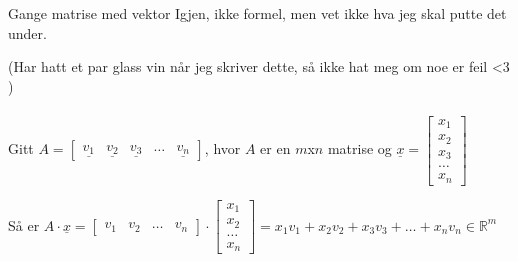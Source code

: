 \documentclass[11pt, a4paper, norsk]{article}
\begin{document}
        \begin{Formel}{Gange matrise med vektor}{}
            Igjen, ikke formel, men vet ikke hva jeg skal putte det under. 

            (Har hatt et par glass vin når jeg skriver dette, så ikke hat meg om noe er feil <3 )
            \\
            \\
            Gitt $A=\begin{bmatrix}
                \underline{v_1} & \underline{v_2} & \underline{v_3} & \dots & \underline{v_{n}}
            \end{bmatrix}$, hvor $A$ er en $m$x$n$ matrise og $\underline{x} = \begin{bmatrix}
                x_1 \\
                x_2 \\
                x_3 \\
                \dots \\
                x_{n}
            \end{bmatrix}$

            Så er $A \cdot \underline{x} = \begin{bmatrix}
                v_1 & v_2 & \dots & v_{n}
            \end{bmatrix} \cdot \begin{bmatrix}
                x_1 \\
                x_2 \\
                \dots \\
                x_{n}
            \end{bmatrix} = x_1v_1 + x_2v_2 + x_3v_3 + \dots + x_{n}v_{n} \in \mathbb{R}^m$ 
        \end{Formel}
\end{document}
